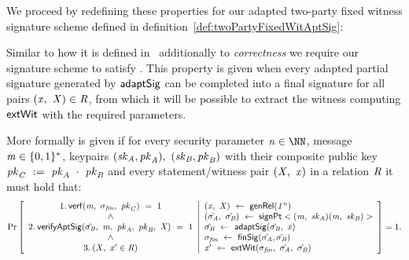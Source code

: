 We proceed by redefining these properties for our adapted two-party fixed witness signature scheme defined in definition~\ref{def:twoPartyFixedWitAptSig}:

\begin{definition}[\cnstAptSigCorrectness]\label{def:aptSigCorrectness}
Similar to how it is defined in~\cite{aumayr2020bitcoinchannels} additionally to \textit{correctness} we require our signature scheme to satisfy \cnstAptSigCorrectness.
This property is given when every adapted partial signature generated by $\mathsf{adaptSig}$ can be completed into a final signature for all pairs $(\mathit{x} ,~ \mathit{X}) \in \mathit{R}$, from which it will
be possible to extract the witness computing $\mathsf{extWit}$ with the required parameters.

More formally \cnstAptSigCorrectness is given if for every security parameter $\varN \in \cnstNatural$, message $\mathit{m} \in \{0,1\}^{*}$, keypairs $(\mathit{sk}_{\mathit{A}}, \mathit{pk}_{\mathit{A}}) ,~ (\mathit{sk}_{\mathit{B}}, \mathit{pk}_{\mathit{B}})$
with their composite public key $\mathit{pk}_{\mathit{C}} ~:=~ \mathit{pk}_{\mathit{A}} ~\cdot~ \mathit{pk}_{\mathit{B}}$ and every statement/witness pair $(\mathit{X} ,~ \mathit{x})$ in a relation $\mathit{R}$ it must hold that:
\[
    \Pr\left[
    \begin{array}{c}
        1.\:\mathsf{verf}(\mathit{m} ,~ \sigma_{\mathit{fin}} ,~ \mathit{pk}_{\mathit{C}}) ~=~ 1 \\
        ~\land~ \\
        2.\: \mathsf{verifyAptSig}(\hat{\sigma_{\mathit{B}}} ,~ \mathit{m} ,~ \mathit{pk}_{\mathit{A}} ,~ \mathit{pk}_{\mathit{B}} ,~ \mathit{X}) ~=~ 1 \\
        ~\land~ \\
        3.\:(\mathit{X} ,~ \mathit{x}' \in \mathit{R})
    \end{array}
    \middle\vert
    \begin{array}{l}
        (\mathit{x} ,~ \mathit{X}) ~\leftarrow~ \mathsf{genRel}(\mathit{1^n}) \\
        (\tilde{\sigma_{\mathit{A}}} ,~ \tilde{\sigma_{\mathit{B}}}) ~\leftarrow~ \mathsf{signPt}<(\mathit{m} ,~ \mathit{sk}_{\mathit{A}})(\mathit{m} ,~ \mathit{sk}_{\mathit{B}})> \\
        \hat{\sigma_{\mathit{B}}} ~\leftarrow~ \mathsf{adaptSig}(\tilde{\sigma_{\mathit{B}}} ,~ \mathit{x}) \\
        \sigma_{\mathit{fin}} ~\leftarrow~ \mathsf{finSig}(\tilde{\sigma_{\mathit{A}}},\tilde{\sigma_{\mathit{B}}}) \\
        \mathit{x}' ~\leftarrow~ \mathsf{extWit}(\sigma_{\mathit{fin}} ,~ \tilde{\sigma_{\mathit{A}}} ,~ \hat{\sigma_{\mathit{B}}})
    \end{array}
    \right]=1.
\]
\end{definition}

